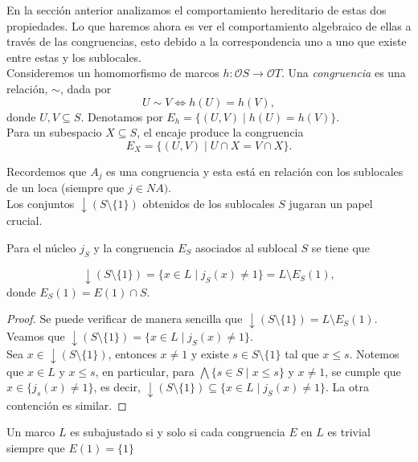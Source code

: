 En la sección anterior analizamos el comportamiento hereditario de estas dos propiedades. Lo que haremos ahora es ver el comportamiento algebraico de ellas a través de las congruencias, esto debido a la correspondencia uno a uno que existe entre estas y los sublocales.\\

Consideremos un homomorfismo de marcos $h\colon \mathcal{O}S\to \mathcal{O}T$. Una \emph{congruencia} es una relación, $\sim$, dada por
\[
U\sim V\Leftrightarrow h(U)=h(V),
\]
donde $U, V\subseteq S$. Denotamos por $E_h=\{(U, V)\mid h(U)=h(V)\}$.\\

Para un subespacio $X\subseteq S$, el encaje produce la congruencia 
\[
E_X=\{(U, V)\mid U\cap X=V\cap X\}.
\]

Recordemos que $A_j$ es una congruencia y esta está en relación con los sublocales de un loca (siempre que $j\in NA)$.\\

Los conjuntos $\downarrow{(S\setminus \{1\})}$ obtenidos de los sublocales $S$ jugaran un papel crucial. 

\begin{prop}\label{Observacion6.1.1}
Para el núcleo $j_S$ y la congruencia $E_S$ asociados al sublocal $S$ se tiene que

\begin{equation}\label{Eq6.1.1}
    \downarrow{(S\setminus\{1\})}=\{x\in L\mid j_S(x)\neq 1\}=L\setminus E_S(1),
\end{equation}
donde $E_S(1)=E(1)\cap S$.
\end{prop}

\begin{proof}
    Se puede verificar de manera sencilla que $\downarrow(S\setminus \{1\})=L\setminus E_S(1)$. Veamos que $\downarrow(S\setminus\{1\})=\{x\in L\mid j_S(x)\neq 1\}$.\\

    Sea $x\in \downarrow(S\setminus \{1\})$, entonces $x\neq 1$ y existe $s\in S\setminus \{1\}$ tal que $x\leq s$. Notemos que $x\in L$ y $x\leq s$, en particular, para $\bigwedge \{s\in S\mid x\leq s\}$ y $x\neq1$, se cumple que $x\in \{j_s(x)\neq 1\}$, es decir, $\downarrow(S\setminus\{1\})\subseteq \{x\in L\mid j_S(x)\neq 1\}$. La otra contención es similar.
\end{proof}

\begin{thm}\label{Teorema6.2}
    Un marco $L$ es subajustado si y solo si cada congruencia $E$ en $L$ es trivial siempre que $E(1)=\{1\}$
\end{thm}

